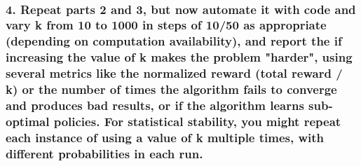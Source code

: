 \documentclass[11pt]{article}
\begin{document}
    \begin{center}
    \end{center}
    { \hspace*{\fill} \\}
    
    \subsubsection{4. Repeat parts 2 and 3, but now automate it with code
and vary k from 10 to 1000 in steps of 10/50 as appropriate (depending
on computation availability), and report the if increasing the value of
k makes the problem "harder", using several metrics like the normalized
reward (total reward / k) or the number of times the algorithm fails to
converge and produces bad results, or if the algorithm learns
sub-optimal policies. For statistical stability, you might repeat each
instance of using a value of k multiple times, with different
probabilities in each
run.}\label{repeat-parts-2-and-3-but-now-automate-it-with-code-and-vary-k-from-10-to-1000-in-steps-of-1050-as-appropriate-depending-on-computation-availability-and-report-the-if-increasing-the-value-of-k-makes-the-problem-harder-using-several-metrics-like-the-normalized-reward-total-reward-k-or-the-number-of-times-the-algorithm-fails-to-converge-and-produces-bad-results-or-if-the-algorithm-learns-sub-optimal-policies.-for-statistical-stability-you-might-repeat-each-instance-of-using-a-value-of-k-multiple-times-with-different-probabilities-in-each-run.}
\end{document}
